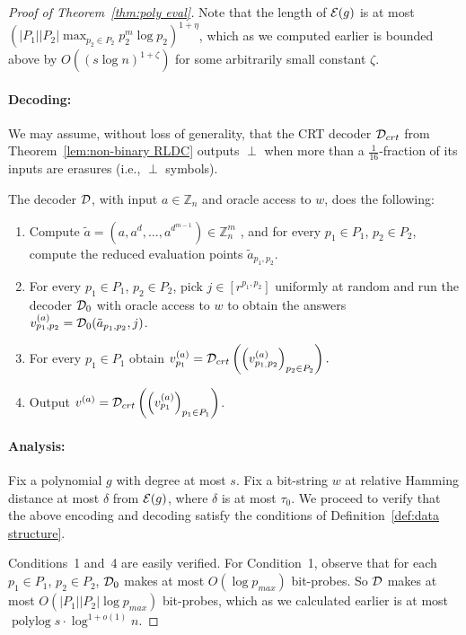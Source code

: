 \documentclass[11pt,english]{article}
\theoremstyle{definition}
\theoremstyle{remark}
\newcommand{\D}{{\cal D}}
\newcommand{\E}{{\cal E}}
\newcommand{\Z}{\mathbb{Z}}
\newcommand{\polylog}{\operatorname{polylog} }
\begin{document}
\begin{proof}[Proof of Theorem~\ref{thm:poly eval}]
Note that the length of $\E(g)$ is at most $(|P_{1}||P_{2}|\max_{p_{2}\in P_{2}}p_{2}^{m}\log p_{2})^{1+\eta}$,
which as we computed earlier is bounded above by $O((s \log n)^{1+\zeta})$ for some arbitrarily small constant $\zeta$.

\paragraph{\textbf{Decoding:}}
We may assume, without loss of generality, that the CRT decoder $\D_{crt}$
from Theorem~\ref{lem:non-binary RLDC} outputs $\perp$ when more
than a $\frac{1}{16}$-fraction of its inputs are erasures (i.e., $\perp$ symbols).

The decoder $\D$, with input $a\in\Z_{n}$ and oracle access to $w$,
does the following: 
\begin{enumerate}
\item Compute $\tilde{a}=(a,a^{d},\ldots,a^{d^{m-1}})\in\Z_{n}^{m}$ , and
for every $p_{1}\in P_{1}$, $p_{2}\in P_{2}$, compute the reduced
evaluation points $\tilde{a}_{p_{1},p_{2}}$. 
\item For every $p_{1}\in P_{1}$, $p_{2}\in P_{2}$, pick $j\in[r^{p_{1},p_{2}}]$
uniformly at random and run the decoder $\D_{0}$ with oracle access
to $w$ to obtain the answers $v_{p_{1},p_{2}}^{(a)}=\D_{0}(\tilde{a}_{p_{1},p_{2}},j)$. 
\item For every $p_{1}\in P_{1}$ obtain 
$\displaystyle v_{p_{1}}^{(a)}=\D_{crt}\left(\left(v_{p_{1,}p_{2}}^{(a)}\right)_{p_{2}\in P_{2}}\right).$
\item Output $v^{(a)}=\D_{crt}\left(\left(v_{p_{1}}^{(a)}\right)_{p_{1}\in P_{1}}\right)$. 
\end{enumerate}

\paragraph{\textbf{Analysis:}}
Fix a polynomial $g$ with degree at most $s$. Fix a bit-string $w$
at relative Hamming distance at most $\delta$ from $\E(g)$, where
$\delta$ is at most $\tau_0$.
We proceed to verify that the above encoding and decoding satisfy
the conditions of Definition~\ref{def:data structure}.

Conditions~1 and~4 are easily verified. For Condition~1, observe
that for each $p_{1}\in P_{1}$, $p_{2}\in P_{2}$, $\D_{0}$ makes
at most $O(\log p_{max})$ bit-probes. So $\D$ makes at most $O(|P_{1}||P_{2}|\log p_{max})$
bit-probes, which as we calculated earlier is at most $\polylog s\cdot\log^{1+o(1)}n$. 


\end{proof}
\end{document}
